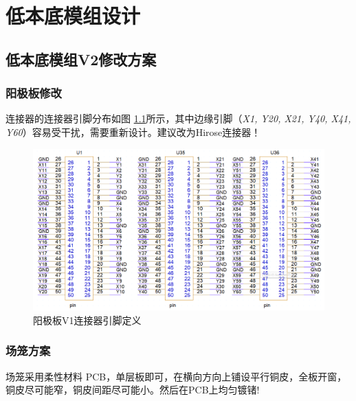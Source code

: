 
\chapter{低本底模组设计}
\label{chap:LowBackgroundModule}

\section{低本底模组V2修改方案}

\subsection{阳极板修改}

连接器的连接器引脚分布如图 \ref{fig:AB_v1_pins}所示，其中边缘引脚（\emph{X1, Y20, X21, Y40, X41, Y60}）容易受干扰，需要重新设计。建议改为Hirose连接器！

\begin{figure}[htbp]
	\centering
	\includegraphics[width=\textwidth]{figures/AB_v1_pins.png}
	\caption{阳极板V1连接器引脚定义}
	\label{fig:AB_v1_pins}
\end{figure}

\subsection{场笼方案}

场笼采用柔性材料 PCB，单层板即可，在横向方向上铺设平行铜皮，全板开窗，铜皮尽可能窄，铜皮间距尽可能小。然后在PCB上均匀镀锗!



